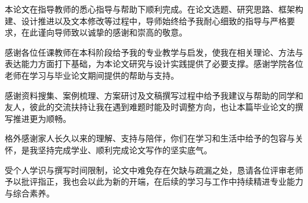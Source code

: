 
\begin{acknowledgements}

本论文在指导教师的悉心指导与帮助下顺利完成。在论文选题、研究思路、框架构建、设计推进以及文本修改等过程中，导师始终给予我耐心细致的指导与严格要求，在此谨向导师致以诚挚的感谢和崇高的敬意。

感谢各位任课教师在本科阶段给予我的专业教学与启发，使我在相关理论、方法与表达能力方面打下基础，为本论文研究与设计实践提供了必要支撑。感谢学院各位老师在学习与毕业论文期间提供的帮助与支持。

感谢资料搜集、案例梳理、方案研讨及文稿撰写过程中给予我建议与帮助的同学和友人，彼此的交流扶持让我在遇到难题时能及时调整方向，也让本篇毕业论文的撰写推进更为顺畅。

格外感谢家人长久以来的理解、支持与陪伴，你们在学习和生活中给予的包容与关怀，是我坚持完成学业、顺利完成论文写作的坚实底气。

受个人学识与撰写时间限制，论文中难免存在欠缺与疏漏之处，恳请各位评审老师予以批评指正，我也会以此为新的开端，在后续的学习与工作中持续精进专业能力与综合素养。

\end{acknowledgements}
